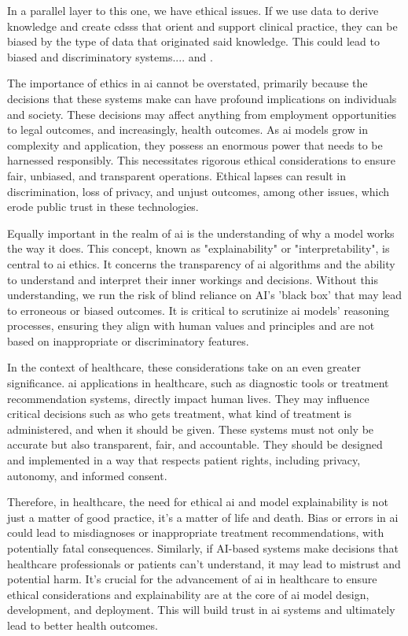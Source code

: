 In a parallel layer to this one, we have ethical issues. If we use data to derive knowledge and create  \acp{cdss} that orient and support clinical practice, they can be biased by the type of data that originated said knowledge.
This could lead to biased and discriminatory systems....
and \cite{EthicsGuidelinesTrustworthy2019}.

The importance of ethics in \ac{ai} cannot be overstated, primarily because the decisions that these systems make can have profound implications on individuals and society. These decisions may affect anything from employment opportunities to legal outcomes, and increasingly, health outcomes. As \ac{ai} models grow in complexity and application, they possess an enormous power that needs to be harnessed responsibly. This necessitates rigorous ethical considerations to ensure fair, unbiased, and transparent operations. Ethical lapses can result in discrimination, loss of privacy, and unjust outcomes, among other issues, which erode public trust in these technologies.

Equally important in the realm of \ac{ai} is the understanding of why a model works the way it does. This concept, known as "explainability" or "interpretability", is central to \ac{ai} ethics. It concerns the transparency of \ac{ai} algorithms and the ability to understand and interpret their inner workings and decisions. Without this understanding, we run the risk of blind reliance on AI's 'black box' that may lead to erroneous or biased outcomes. It is critical to scrutinize \ac{ai} models' reasoning processes, ensuring they align with human values and principles and are not based on inappropriate or discriminatory features.

In the context of healthcare, these considerations take on an even greater significance. \ac{ai} applications in healthcare, such as diagnostic tools or treatment recommendation systems, directly impact human lives. They may influence critical decisions such as who gets treatment, what kind of treatment is administered, and when it should be given. These systems must not only be accurate but also transparent, fair, and accountable. They should be designed and implemented in a way that respects patient rights, including privacy, autonomy, and informed consent.

Therefore, in healthcare, the need for ethical \ac{ai} and model explainability is not just a matter of good practice, it's a matter of life and death. Bias or errors in \ac{ai} could lead to misdiagnoses or inappropriate treatment recommendations, with potentially fatal consequences. Similarly, if AI-based systems make decisions that healthcare professionals or patients can't understand, it may lead to mistrust and potential harm. It's crucial for the advancement of \ac{ai} in healthcare to ensure ethical considerations and explainability are at the core of \ac{ai} model design, development, and deployment. This will build trust in \ac{ai} systems and ultimately lead to better health outcomes.


